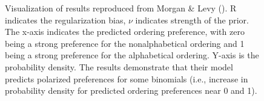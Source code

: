 \documentclass[
  12pt,
]{scrartcl}
\begin{document}
\begin{figure}[htbp]

\caption{\label{fig-morganfreqresults}Visualization of results
reproduced from Morgan \& Levy
().
R indicates the regularization bias, \(\nu\) indicates strength of the
prior. The x-axis indicates the predicted ordering preference, with zero
being a strong preference for the nonalphabetical ordering and 1 being a
strong preference for the alphabetical ordering. Y-axis is the
probability density. The results demonstrate that their model predicts
polarized preferences for some binomials (i.e., increase in probability
density for predicted ordering preferences near 0 and 1).}


\end{figure}%
\end{document}
